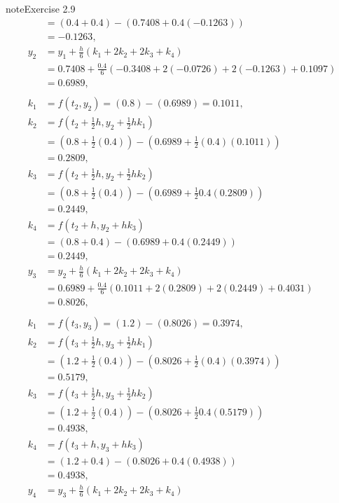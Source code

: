 \documentclass[letterpaper,10pt,english]{jupyterBook}
\begin{document}
\begin{sphinxadmonition}{note}{Exercise 2.9}
\begin{align*}
    &= (0.4 + 0.4) - (0.7408 + 0.4(-0.1263)) \\
    &= -0.1263, \\
    y_2 &= y_1 + \frac{h}{6} (k_1 + 2 k_2 + 2 k_3 + k_4) \\
    &= 0.7408 + \frac{0.4}{6} (-0.3408 + 2(-0.0726) + 2(-0.1263) + 0.1097) \\
    &= 0.6989, \\
    \\
    k_1 &= f(t_2, y_2) = (0.8) - (0.6989) = 0.1011, \\
    k_2 &= f(t_2 + \tfrac{1}{2}h, y_2 + \tfrac{1}{2}hk_1) \\
    &= (0.8 + \tfrac{1}{2}(0.4)) - (0.6989 + \tfrac{1}{2}(0.4)(0.1011)) \\
    &= 0.2809, \\
    k_3 &= f(t_2 + \tfrac{1}{2}h, y_2 + \tfrac{1}{2} hk_2) \\
    &= (0.8 + \tfrac{1}{2}(0.4)) - (0.6989 + \tfrac{1}{2}0.4(0.2809)) \\
    &= 0.2449, \\
    k_4 &= f(t_2 + h, y_2 + hk_3) \\
    &= (0.8 + 0.4) - (0.6989 + 0.4(0.2449)) \\
    &= 0.2449, \\
    y_3 &= y_2 + \frac{h}{6} (k_1 + 2 k_2 + 2 k_3 + k_4) \\
    &= 0.6989 + \frac{0.4}{6} (0.1011 + 2(0.2809) + 2(0.2449) + 0.4031) \\
    &= 0.8026, \\
    \\
    k_1 &= f(t_3, y_3) = (1.2) - (0.8026) = 0.3974, \\
    k_2 &= f(t_3 + \tfrac{1}{2}h, y_3 + \tfrac{1}{2}hk_1) \\
    &= (1.2 + \tfrac{1}{2}(0.4)) - (0.8026 + \tfrac{1}{2}(0.4)(0.3974)) \\
    &= 0.5179, \\
    k_3 &= f(t_3 + \tfrac{1}{2}h, y_3 + \tfrac{1}{2} hk_2) \\
    &= (1.2 + \tfrac{1}{2}(0.4)) - (0.8026 + \tfrac{1}{2}0.4(0.5179)) \\
    &= 0.4938, \\
    k_4 &= f(t_3 + h, y_3 + hk_3) \\
    &= (1.2 + 0.4) - (0.8026 + 0.4(0.4938)) \\
    &= 0.4938, \\
    y_4 &= y_3 + \frac{h}{6} (k_1 + 2 k_2 + 2 k_3 + k_4) \\

\end{align*}
\end{sphinxadmonition}
\end{document}

